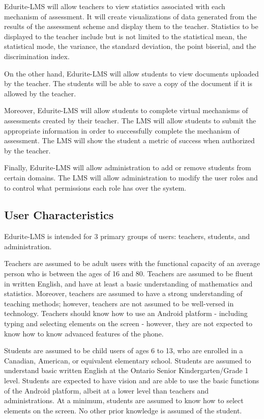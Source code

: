 \documentclass[]{article}
\begin{document}
Edurite-LMS will allow teachers to view statistics associated with each
mechanism of assessment. It will create visualizations of data generated from
the results of the assessment scheme and display them to the teacher. Statistics
to be displayed to the teacher include but is not limited to the statistical
mean, the statistical mode, the variance, the standard deviation, the point
biserial, and the discrimination index.

On the other hand, Edurite-LMS will allow students to view documents uploaded by
the teacher. The students will be able to save a copy of the document if it is
allowed by the teacher.

Moreover, Edurite-LMS will allow students to complete virtual mechanisms of
assessments created by their teacher. The LMS will allow students to submit the
appropriate information in order to successfully complete the mechanism of
assessment. The LMS will show the student a metric of success when authorized by
the teacher.

Finally, Edurite-LMS will allow administration to add or remove students from
certain domains. The LMS will allow administration to modify the user roles and
to control what permissions each role has over the system.

\subsection{User Characteristics}
\label{sub:user_characteristics}
Edurite-LMS is intended for 3 primary groups of users: teachers, students, and
administration.

Teachers are assumed to be adult users with the functional capacity of an
average person who is between the ages of 16 and 80. Teachers are assumed to be
fluent in written English, and have at least a basic understanding of
mathematics and statistics. Moreover, teachers are assumed to have a strong
understanding of teaching methods; however, teachers are not assumed to be
well-versed in technology. Teachers should know how to use an Android platform
- including typing and selecting elements on the screen - however, they are not
expected to know how to know advanced features of the phone.

Students are assumed to be child users of ages 6 to 13, who are enrolled in a
Canadian, American, or equivalent elementary school. Students are assumed to
understand basic written English at the Ontario Senior Kindergarten/Grade 1
level. Students are expected to have vision and are able to use the basic
functions of the Android platform, albeit at a lower level than teachers and
administrations. At a minimum, students are assumed to know how to select
elements on the screen. No other prior knowledge is assumed of the student.
\end{document}
